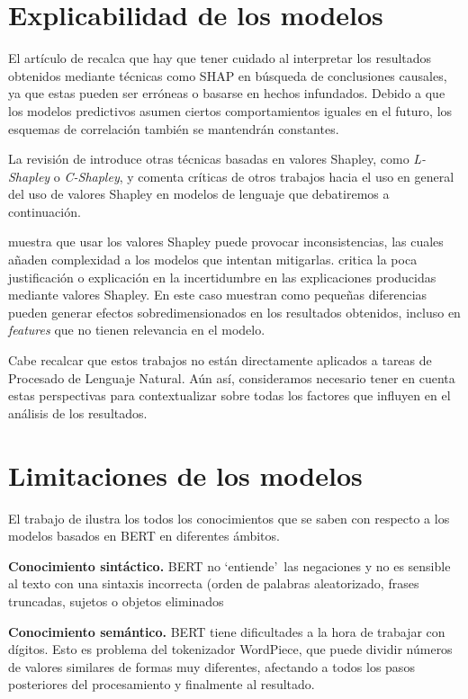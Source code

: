 \section{Explicabilidad de los modelos}
\label{sec:expl}

El artículo de \citet{Dillon2021} recalca que hay que tener cuidado al interpretar los resultados obtenidos mediante técnicas como SHAP en búsqueda de conclusiones causales, ya que estas pueden ser erróneas o basarse en hechos infundados. Debido a que los modelos predictivos asumen ciertos comportamientos iguales en el futuro, los esquemas de correlación también se mantendrán constantes.

La revisión de \citet{Mosca2022} introduce otras técnicas basadas en valores Shapley, como \textit{L-Shapley} o \textit{C-Shapley}, y comenta críticas de otros trabajos hacia el uso en general del uso de valores Shapley en modelos de lenguaje que debatiremos a continuación.

\citet{Kumar2020} muestra que usar los valores Shapley puede provocar inconsistencias, las cuales añaden complexidad a los modelos que intentan mitigarlas. \citet{Merrick2019} critica la poca justificación o explicación en la incertidumbre en las explicaciones producidas mediante valores Shapley. En este caso muestran como pequeñas diferencias pueden generar efectos sobredimensionados en los resultados obtenidos, incluso en \textit{features} que no tienen relevancia en el modelo.

Cabe recalcar que estos trabajos no están directamente aplicados a tareas de Procesado de Lenguaje Natural. Aún así, consideramos necesario tener en cuenta estas perspectivas para contextualizar sobre todas los factores que influyen en el análisis de los resultados.

\section{Limitaciones de los modelos}

El trabajo de \citet{Rogers2020} ilustra los todos los conocimientos que se saben con respecto a los modelos basados en BERT en diferentes ámbitos.

\textbf{Conocimiento sintáctico.} BERT no `entiende'\ las negaciones y no es sensible al texto con una sintaxis incorrecta (orden de palabras aleatorizado, frases truncadas, sujetos o objetos eliminados \citep{Ettinger2019}

\textbf{Conocimiento semántico.} BERT tiene dificultades a la hora de trabajar con dígitos. Esto es problema del tokenizador WordPiece, que puede dividir números de valores similares de formas muy diferentes, afectando a todos los pasos posteriores del procesamiento y finalmente al resultado.

